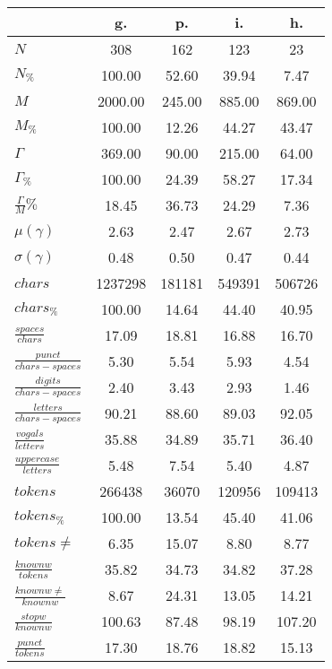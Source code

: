 \begin{table}[h!]
\begin{center}
\begin{tabular}{| l || c | c | c | c |}\hline
 & {\bf g.} & {\bf p.} & {\bf i.} & {\bf h.} \\\hline\hline
$N$ & 308  & 162  & 123  & 23 \\
$N_{\%}$ & 100.00  & 52.60  & 39.94  & 7.47 \\\hline
$M$ & 2000.00  & 245.00  & 885.00  & 869.00 \\
$M_{\%}$ & 100.00  & 12.26  & 44.27  & 43.47 \\\hline
$\Gamma$ & 369.00  & 90.00  & 215.00  & 64.00 \\
$\Gamma_{\%}$ & 100.00  & 24.39  & 58.27  & 17.34 \\\hline
$\frac{\Gamma}{M}\%$ & 18.45  & 36.73  & 24.29  & 7.36 \\
$\mu(\gamma)$ & 2.63  & 2.47  & 2.67  & 2.73 \\
$\sigma(\gamma)$ & 0.48  & 0.50  & 0.47  & 0.44 \\\hline\hline
$chars$ & 1237298  & 181181  & 549391  & 506726 \\
$chars_{\%}$ & 100.00  & 14.64  & 44.40  & 40.95 \\\hline
$\frac{spaces}{chars}$ & 17.09  & 18.81  & 16.88  & 16.70 \\
$\frac{punct}{chars-spaces}$ & 5.30  & 5.54  & 5.93  & 4.54 \\
$\frac{digits}{chars-spaces}$ & 2.40  & 3.43  & 2.93  & 1.46 \\\hline
$\frac{letters}{chars-spaces}$ & 90.21  & 88.60  & 89.03  & 92.05 \\
$\frac{vogals}{letters}$ & 35.88  & 34.89  & 35.71  & 36.40 \\
$\frac{uppercase}{letters}$ & 5.48  & 7.54  & 5.40  & 4.87 \\\hline\hline
$tokens$ & 266438  & 36070  & 120956  & 109413 \\
$tokens_{\%}$ & 100.00  & 13.54  & 45.40  & 41.06 \\
$tokens \neq$ & 6.35  & 15.07  & 8.80  & 8.77 \\\hline
$\frac{knownw}{tokens}$ & 35.82  & 34.73  & 34.82  & 37.28 \\
$\frac{knownw \neq}{knownw}$ & 8.67  & 24.31  & 13.05  & 14.21 \\\hline
$\frac{stopw}{knownw}$ & 100.63  & 87.48  & 98.19  & 107.20 \\
$\frac{punct}{tokens}$ & 17.30  & 18.76  & 18.82  & 15.13 \\

\end{tabular}
\end{center}
\end{table}
